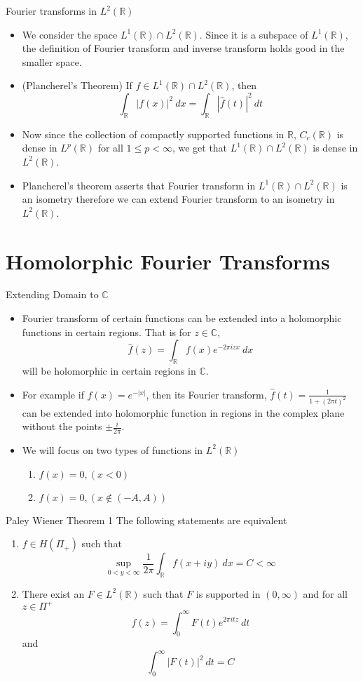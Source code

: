 \documentclass[compress]{beamer}
\newcommand{\R}{\mathbb R}
\newcommand{\C}{\mathbb C}
\begin{document}
\begin{frame}{Fourier transforms in $L^2(\R)$}
  \begin{itemize}
    \item We consider the space $L^1(\R) \cap L^2(\R)$. Since it is a subspace of $L^1(\R)$, the definition of Fourier transform and inverse transform holds good in the smaller space.
    \item (Plancherel's Theorem) If $f \in L^1(\R) \cap L^2(\R)$, then $$\int_\R |f(x)|^2 \ dx = \int_\R |\hat{f}(t)|^2 \ dt$$
    \item Now since the collection of compactly supported functions in $\R$, $C_c(\R)$ is dense in $L^p(\R)$ for all $1 \le p < \infty$, we get that $L^1(\R) \cap L^2(\R)$ is dense in $L^2(\R)$.
    \item Plancherel's theorem asserts that Fourier transform in $L^1(\R) \cap L^2(\R)$ is an isometry therefore we can extend Fourier transform to an isometry in $L^2(\R)$.
  \end{itemize}
\end{frame}


\section{Homolorphic Fourier Transforms}
\begin{frame}{Extending Domain to $\C$}
  \begin{itemize}
    \item Fourier transform of certain functions can be extended into a holomorphic functions in certain regions. That is for $z \in \C$, $$\hat{f}(z) = \int_\R f(x)e^{-2\pi izx} \ dx $$
      will be holomorphic in certain regions in $\C$.
    \item For example if $f(x) = e^{-|x|}$, then its Fourier transform, $\hat{f}(t) = \frac{1}{1+(2\pi t)^2}$ can be extended into holomorphic function in regions in the complex plane without the points $\pm \frac{i}{2\pi}$.
    \item We will focus on two types of functions in $L^2(\R)$
      \begin{enumerate}
        \item $f(x) = 0, (x<0)$
        \item $f(x) = 0, (x \notin (-A, A))$
      \end{enumerate}
  \end{itemize}
\end{frame}

\begin{frame}{Paley Wiener Theorem 1}
  The following statements are equivalent
  \begin{enumerate}
    \item $f \in H(\Pi_+)$ such that $$\sup_{0<y<\infty} \frac{1}{2\pi}\int_\R f(x+iy) \ dx = C < \infty$$
    \item There exist an $F \in L^2(\R)$ such that $F$ is supported in $(0, \infty)$ and for all $z \in \Pi^+$ $$f(z) = \int_0^\infty F(t) e^{2\pi it z} \ dt$$
      and $$\int_0^\infty |F(t)|^2 \ dt = C$$
  \end{enumerate}
\end{frame}
\end{document}
